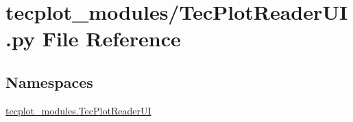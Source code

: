 \hypertarget{a00044}{}\section{tecplot\+\_\+modules/\+Tec\+Plot\+Reader\+UI.py File Reference}
\label{a00044}
\subsection*{Namespaces}
\begin{DoxyCompactItemize}
\item 
 \hyperlink{a00066}{tecplot\+\_\+modules.\+Tec\+Plot\+Reader\+UI}
\end{DoxyCompactItemize}
